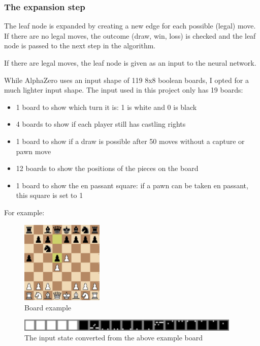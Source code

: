 \documentclass{article}
\begin{document}
\subsubsection{The expansion step}

The leaf node is expanded by creating a new edge for each possible (legal) move.
If there are no legal moves, the outcome (draw, win, loss) is checked and the leaf node
is passed to the next step in the algorithm.

If there are legal moves, the leaf node is given as an input to the neural network.

While AlphaZero uses an input shape of 119 8x8 boolean boards, I opted for a much lighter 
input shape. The input used in this project only has 19 boards:

\begin{itemize}
    \item 1 board to show which turn it is: 1 is white and 0 is black
    \item 4 boards to show if each player still has castling rights
    \item 1 board to show if a draw is possible after 50 moves without a capture or pawn move
    \item 12 boards to show the positions of the pieces on the board
    \item 1 board to show the en passant square: if a pawn can be taken en passant, this square is set to 1
\end{itemize}

For example: 

\begin{figure}[H]
    \centering
    \includegraphics[width=0.35\textwidth]{img/input-boards2.png}
    \caption{Board example}
\end{figure}

\begin{figure}[H]
    \centering
    \includegraphics[width=0.95\textwidth]{img/input-boards.png}
    \caption{The input state converted from the above example board}
\end{figure}
\end{document}
